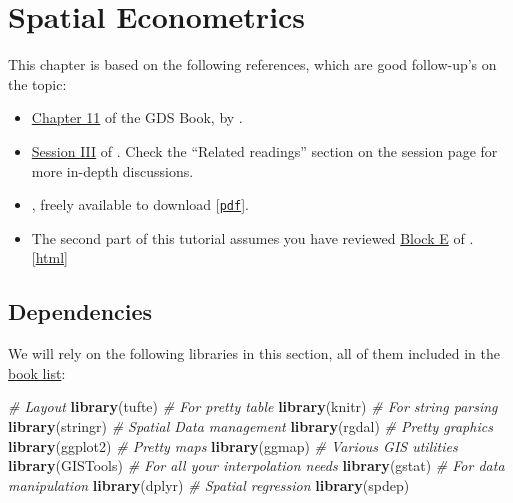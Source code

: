 \documentclass[
]{book}
\newenvironment{Shaded}{\begin{snugshade}}{\end{snugshade}}
\newcommand{\CommentTok}[1]{\textcolor[rgb]{0.56,0.35,0.01}{\textit{#1}}}
\newcommand{\KeywordTok}[1]{\textcolor[rgb]{0.13,0.29,0.53}{\textbf{#1}}}
\newcommand{\NormalTok}[1]{#1}
\providecommand{\tightlist}{%
  \setlength{\itemsep}{0pt}\setlength{\parskip}{0pt}}
\begin{document}
\hypertarget{spatialecon}{%
\chapter{Spatial Econometrics}\label{spatialecon}}

This chapter is based on the following references, which are good follow-up's on the topic:

\begin{itemize}
\tightlist
\item
  \href{https://geographicdata.science/book/notebooks/11_regression.html}{Chapter 11} of the GDS Book, by \citet{reyABwolf}.
\item
  \href{http://darribas.org/sdar_mini/notes/Class_03.html}{Session III} of \citet{arribas2014spatial}. Check the ``Related readings'' section on the session page for more in-depth discussions.
\item
  \citet{anselin2005spatial}, freely available to download {[}\href{http://csiss.org/GISPopSci/workshops/2011/PSU/readings/W15_Anselin2007.pdf}{\texttt{pdf}}{]}.
\item
  The second part of this tutorial assumes you have reviewed \href{https://darribas.org/gds_course/content/bE/concepts_E.html}{Block E} of \citet{darribas_gds_course}. {[}\href{https://darribas.org/gds_course/content/bE/concepts_E.html}{html}{]}
\end{itemize}

\hypertarget{dependencies-3}{%
\section{Dependencies}\label{dependencies-3}}

We will rely on the following libraries in this section, all of them included in the \protect\hyperlink{Dependency-list}{book list}:

\begin{Shaded}
\begin{Highlighting}[]
\CommentTok{# Layout}
\KeywordTok{library}\NormalTok{(tufte)}
\CommentTok{# For pretty table}
\KeywordTok{library}\NormalTok{(knitr)}
\CommentTok{# For string parsing}
\KeywordTok{library}\NormalTok{(stringr)}
\CommentTok{# Spatial Data management}
\KeywordTok{library}\NormalTok{(rgdal)}
\CommentTok{# Pretty graphics}
\KeywordTok{library}\NormalTok{(ggplot2)}
\CommentTok{# Pretty maps}
\KeywordTok{library}\NormalTok{(ggmap)}
\CommentTok{# Various GIS utilities}
\KeywordTok{library}\NormalTok{(GISTools)}
\CommentTok{# For all your interpolation needs}
\KeywordTok{library}\NormalTok{(gstat)}
\CommentTok{# For data manipulation}
\KeywordTok{library}\NormalTok{(dplyr)}
\CommentTok{# Spatial regression}
\KeywordTok{library}\NormalTok{(spdep)}
\end{Highlighting}
\end{Shaded}
\end{document}
